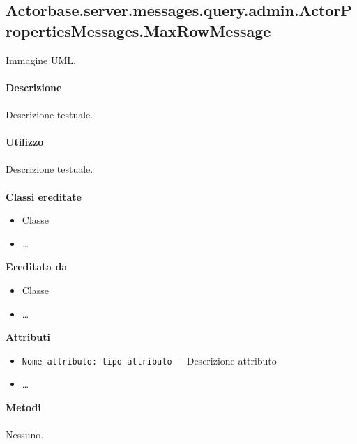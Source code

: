 \documentclass[a4paper]{article}
\begin{document}
\subsection{Actorbase.server.messages.query.admin.ActorPropertiesMessages.MaxRowMessage}
		Immagine UML.
		\\ \\
		\textbf{Descrizione}
			\\ \\
			Descrizione testuale.
			\\ \\
		\textbf{Utilizzo}
			\\ \\
			Descrizione testuale.
			\\ \\
		\textbf{Classi ereditate}
			\begin{itemize}
				\item Classe
				\item \dots
			\end{itemize}
		\textbf{Ereditata da}
			\begin{itemize}
				\item Classe
				\item \dots
			\end{itemize}
		\textbf{Attributi}
			\begin{itemize}
				\item \texttt{Nome attributo: tipo attributo } - Descrizione attributo
				\item \dots
			\end{itemize}
		\textbf{Metodi}
			\\ \\
			Nessuno.
			
\end{document}
